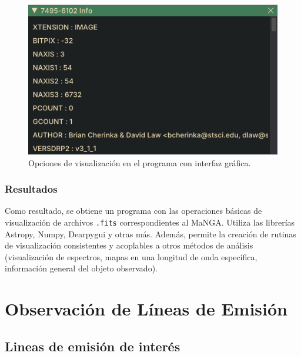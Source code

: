 \documentclass[9pt,twocolumn,a4paper]{opticajnl}
\begin{document}
\begin{figure}
\includegraphics[width=0.8\linewidth]{moreinfo.png}
\caption{Opciones de visualización en el programa con interfaz gráfica.}
\label{fig
}
\end{figure}

\subsubsection*{Resultados}
Como resultado, se obtiene un programa con las operaciones básicas de visualización de archivos \verb|.fits| correspondientes al MaNGA. Utiliza las librerías Astropy, Numpy, Dearpygui y otras más. Además, permite la creación de rutinas de visualización consistentes y acoplables a otros métodos de análisis (visualización de espectros, mapas en una longitud de onda específica, información general del objeto observado).

\section*{Observación de Líneas de Emisión}

\subsection*{Lineas de emisión de interés}
\end{document}
